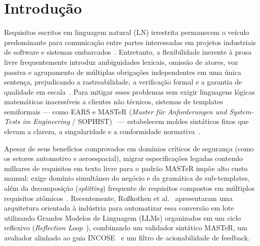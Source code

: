 \section{Introdução}

Requisitos escritos em linguagem natural (LN) irrestrita permanecem o veículo predominante para comunicação entre partes interessadas em projetos industriais de software e sistemas embarcados~\cite{darif2026controlled}. Entretanto, a flexibilidade inerente à prosa livre frequentemente introduz ambiguidades lexicais, omissão de atores, voz passiva e agrupamento de múltiplas obrigações independentes em uma única sentença, prejudicando a rastreabilidade, a verificação formal e a garantia de qualidade em escala~\cite{incose2023guide, grosser2024benchmarking}. Para mitigar esses problemas sem exigir linguagens lógicas matemáticas inacessíveis a clientes não técnicos, sistemas de templates semiformais --- como EARS e MASTeR (\textit{Muster für Anforderungen und System-Tests im Engineering} / SOPHIST)~\cite{sophist2020master, rupp2014anforderungsschablonen} --- estabelecem moldes sintáticos fixos que elevam a clareza, a singularidade e a conformidade normativa~\cite{grosser2023comparative, grosser2024benchmarking}.

Apesar de seus benefícios comprovados em domínios críticos de segurança (como os setores automotivo e aeroespacial), migrar especificações legadas contendo milhares de requisitos em texto livre para o padrão MASTeR impõe alto custo manual: exige domínio simultâneo do negócio e da gramática de sub-templates, além da decomposição (\textit{splitting}) frequente de requisitos compostos em múltiplos requisitos atômicos~\cite{rosskothen2026converting}. Recentemente, Ro\ss kothen et al.~\cite{rosskothen2026converting} apresentaram uma arquitetura orientada à indústria para automatizar essa conversão em lote utilizando Grandes Modelos de Linguagem (LLMs) organizados em um ciclo reflexivo (\textit{Reflection Loop}~\cite{ji2023mitigating}), combinando um validador sintático MASTeR, um avaliador alinhado ao guia INCOSE~\cite{incose2023guide} e um filtro de acionabilidade de feedback.

